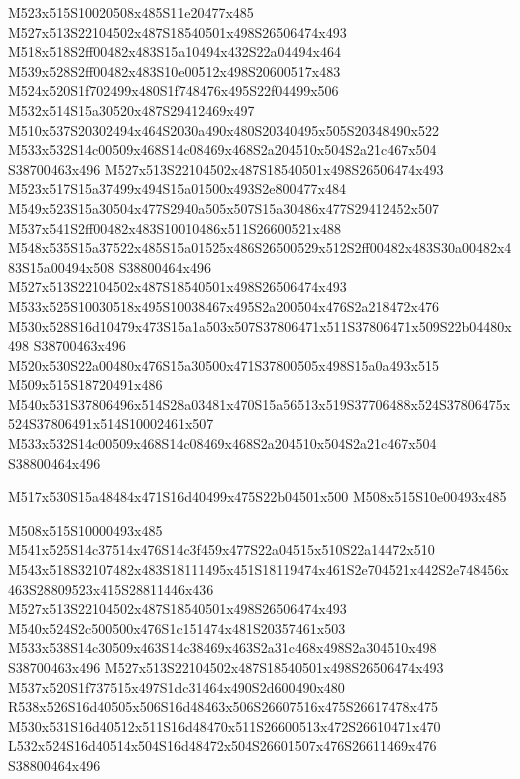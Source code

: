\documentclass{article}
\begin{document}
\begin{multicols}{2}
M523x515S10020508x485S11e20477x485 M527x513S22104502x487S18540501x498S26506474x493 M518x518S2ff00482x483S15a10494x432S22a04494x464 M539x528S2ff00482x483S10e00512x498S20600517x483 M524x520S1f702499x480S1f748476x495S22f04499x506 M532x514S15a30520x487S29412469x497 M510x537S20302494x464S2030a490x480S20340495x505S20348490x522 M533x532S14c00509x468S14c08469x468S2a204510x504S2a21c467x504 S38700463x496 M527x513S22104502x487S18540501x498S26506474x493 M523x517S15a37499x494S15a01500x493S2e800477x484 M549x523S15a30504x477S2940a505x507S15a30486x477S29412452x507 M537x541S2ff00482x483S10010486x511S26600521x488 M548x535S15a37522x485S15a01525x486S26500529x512S2ff00482x483S30a00482x483S15a00494x508 S38800464x496 M527x513S22104502x487S18540501x498S26506474x493 M533x525S10030518x495S10038467x495S2a200504x476S2a218472x476 M530x528S16d10479x473S15a1a503x507S37806471x511S37806471x509S22b04480x498 S38700463x496 M520x530S22a00480x476S15a30500x471S37800505x498S15a0a493x515 M509x515S18720491x486 M540x531S37806496x514S28a03481x470S15a56513x519S37706488x524S37806475x524S37806491x514S10002461x507 M533x532S14c00509x468S14c08469x468S2a204510x504S2a21c467x504 S38800464x496

\begin{center}
M517x530S15a48484x471S16d40499x475S22b04501x500 M508x515S10e00493x485 
\end{center}


M508x515S10000493x485 M541x525S14c37514x476S14c3f459x477S22a04515x510S22a14472x510 M543x518S32107482x483S18111495x451S18119474x461S2e704521x442S2e748456x463S28809523x415S28811446x436 M527x513S22104502x487S18540501x498S26506474x493 M540x524S2c500500x476S1c151474x481S20357461x503 M533x538S14c30509x463S14c38469x463S2a31c468x498S2a304510x498 S38700463x496 M527x513S22104502x487S18540501x498S26506474x493 M537x520S1f737515x497S1dc31464x490S2d600490x480 R538x526S16d40505x506S16d48463x506S26607516x475S26617478x475 M530x531S16d40512x511S16d48470x511S26600513x472S26610471x470 L532x524S16d40514x504S16d48472x504S26601507x476S26611469x476 S38800464x496


\end{multicols}
\end{document}
